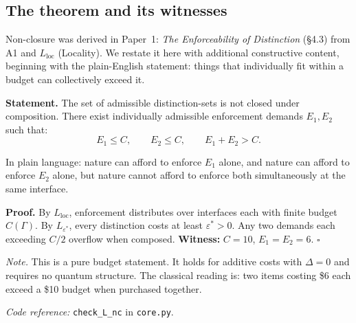 \documentclass[11pt]{article}
\newcommand{\coderef}[2]{\smallskip\noindent\textit{Code reference:} \texttt{#1} in \texttt{#2}.}
\begin{document}
\subsection{The theorem and its witnesses}

Non-closure was derived in Paper~1: \emph{The Enforceability of Distinction} (\S4.3) from A1 and $L_{\mathrm{loc}}$ (Locality).  We restate it here with additional constructive content, beginning with the plain-English statement: things that individually fit within a budget can collectively exceed it.

\begin{tcolorbox}[apfbox, title={Lemma $L_{\mathrm{nc}}^{\mathrm{budget}}$ (Budget Non-Closure)}]
\textbf{Statement.}  The set of admissible distinction-sets is not closed under composition.  There exist individually admissible enforcement demands $E_1, E_2$ such that:
\begin{equation}
E_1 \le C, \qquad E_2 \le C, \qquad E_1 + E_2 > C.
\label{eq:nonclosure}
\end{equation}

In plain language: nature can afford to enforce $E_1$ alone, and nature can afford to enforce $E_2$ alone, but nature cannot afford to enforce both simultaneously at the same interface.

\smallskip\noindent\textbf{Proof.}  By $L_{\mathrm{loc}}$, enforcement distributes over interfaces each with finite budget $C(\Gamma)$.  By $L_{\varepsilon^*}$, every distinction costs at least $\varepsilon^* > 0$.  Any two demands each exceeding $C/2$ overflow when composed.  \textbf{Witness:} $C = 10$, $E_1 = E_2 = 6$.  $\square$

\smallskip\noindent\textit{Note.}  This is a pure budget statement.  It holds for additive costs with $\Delta = 0$ and requires no quantum structure.  The classical reading is: two items costing \$6 each exceed a \$10 budget when purchased together.

\coderef{check\_L\_nc}{core.py}
\end{tcolorbox}
\end{document}
